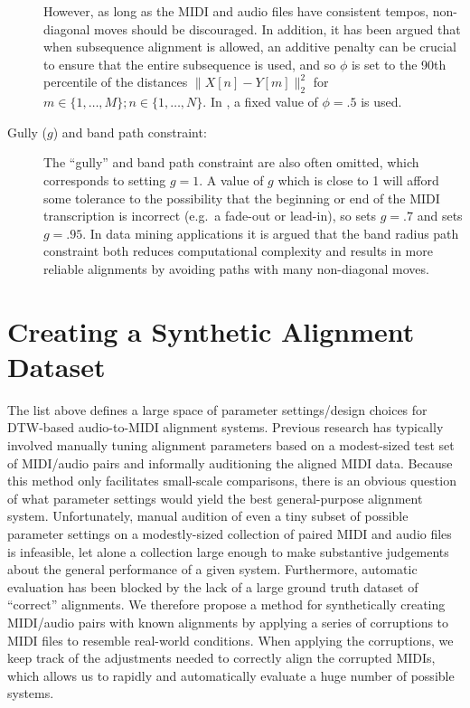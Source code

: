 \begin{description}
However, as long as the MIDI and audio files have consistent tempos, non-diagonal moves should be discouraged.
In addition, it has been argued \cite{raffel2015large} that when subsequence alignment is allowed, an additive penalty can be crucial to ensure that the entire subsequence is used, and so $\phi$ is set to the 90th percentile of the distances $\|X[n] - Y[m]\|_2^2$ for $m \in \{1, \ldots, M\}; n \in \{1, \ldots, N\}$.
In \cite{ellis2013aligning}, a fixed value of $\phi = .5$ is used.
\item[Gully ($g$) and band path constraint:] The ``gully'' and band path constraint are also often omitted, which corresponds to setting $g = 1$.
A value of $g$ which is close to 1 will afford some tolerance to the possibility that the beginning or end of the MIDI transcription is incorrect (e.g.\ a fade-out or lead-in), so \cite{ellis2013aligning} sets $g = .7$ and \cite{raffel2015large} sets $g = .95$.
In data mining applications \cite{ratanamahatana2004everything} it is argued that the band radius path constraint both reduces computational complexity and results in more reliable alignments by avoiding paths with many non-diagonal moves.
\end{description}

\section{Creating a Synthetic Alignment Dataset}
\label{sec:synthetic}

The list above defines a large space of parameter settings/design choices for DTW-based audio-to-MIDI alignment systems.
Previous research has typically involved manually tuning alignment parameters based on a modest-sized test set of MIDI/audio pairs and informally auditioning the aligned MIDI data.
Because this method only facilitates small-scale comparisons, there is an obvious question of what parameter settings would yield the best general-purpose alignment system.
Unfortunately, manual audition of even a tiny subset of possible parameter settings on a modestly-sized collection of paired MIDI and audio files is infeasible, let alone a collection large enough to make substantive judgements about the general performance of a given system.
Furthermore, automatic evaluation has been blocked by the lack of a large ground truth dataset of ``correct'' alignments.
We therefore propose a method for synthetically creating MIDI/audio pairs with known alignments by applying a series of corruptions to MIDI files to resemble real-world conditions.
When applying the corruptions, we keep track of the adjustments needed to correctly align the corrupted MIDIs, which allows us to rapidly and automatically evaluate a huge number of possible systems.


